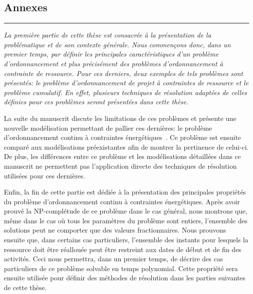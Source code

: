 \cleardoublepage
{}
\begin{center}
  \begin{minipage}{\textwidth}
  \part*{Annexes}
\end{minipage}
\end{center}

\newpage
\thispagestyle{empty}
\begin{center}
  \begin{minipage}{\textwidth}
    \hrule
    \vspace{0.5cm}
    {\it  La première partie de cette thèse est consacrée à la présentation de
    la problématique et de son contexte générale. Nous commençons donc,
    dans un premier temps, par définir les principales caractéristiques
    d'un problème d'ordonnancement et plus précisément des problèmes
    d'ordonnancement à contrainte de ressource. Pour ces derniers,
    deux exemples de tels problèmes sont présentés: le problème
    d'ordonnancement de projet à contraintes de ressource et le
    problème cumulatif. En effet, plusieurs techniques de résolution
    adaptées de celles définies pour ces problèmes seront présentées
    dans cette thèse. 

    La suite du manuscrit discute les limitations de ces problèmes
    et présente une nouvelle modélisation permettant de pallier ces
    dernières: le problème d'ordonnancement continu à contraintes
    énergétiques~\cite{ArtiguesLopez,Nattaf_ORSpectrum,Nattaf_Constraints}. Ce
    problème est ensuite comparé aux modélisations préexistantes afin de
    montrer la pertinence de celui-ci. De plus, les différences entre ce
    problème et les modélisations détaillées dans ce manuscrit ne
    permettent pas l'application directe des techniques de résolution
    utilisées pour ces dernières.

    Enfin, la fin de cette partie est dédiée à la présentation des
    principales propriétés du problème d'ordonnancement continu à
    contraintes énergétiques. Après avoir prouvé la NP-complétude de ce
    problème dans le cas général, nous montrons que, même dans le cas où
    tous les paramètres du problème sont entiers, l'ensemble des solutions
    peut ne comporter que des valeurs fractionnaires. Nous prouvons
    ensuite que, dans certains cas particuliers, l'ensemble des instants
    pour lesquels la ressource doit être réallouée peut être
    restreint aux dates de début et de fin des activités. Ceci nous
    permettra, dans un premier temps, de décrire des cas particuliers
    de ce problème solvable en temps polynomial. Cette propriété sera
    ensuite utilisée pour définir des méthodes de résolution dans les
    parties suivantes de cette thèse. 

}
\end{minipage}
\end{center}
